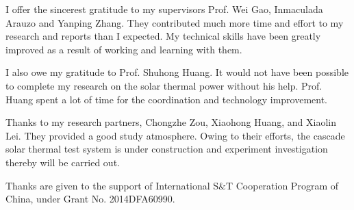 \backmatter
\begin{ack}
%  
%  
%  
%  

I offer the sincerest gratitude to my supervisors Prof. Wei Gao, Inmaculada Arauzo and Yanping Zhang. They contributed much more time and effort to my research and reports than I expected. My technical skills have been greatly improved as a result of working and learning with them.

I also owe my gratitude to Prof. Shuhong Huang. It would not have been possible to complete my research on the solar thermal power without his help. Prof. Huang spent a lot of time for the coordination and technology improvement. 

Thanks to my research partners, Chongzhe Zou, Xiaohong Huang, and Xiaolin Lei. They provided a good study atmosphere.
Owing to their efforts, the cascade solar thermal test system is under construction and experiment investigation thereby  will be carried out.

Thanks are given to the support of International S$\&$T Cooperation Program of China, under Grant No. 2014DFA60990.  
\end{ack}

